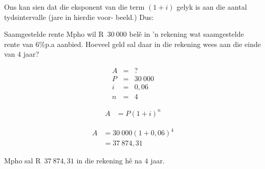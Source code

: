 Ons kan sien dat die eksponent van die term $(1 + i)$ gelyk is aan die aantal tydsintervalle (jare in hierdie voor-
beeld.) Dus:




\begin{wex}{Saamgestelde rente}{
    Mpho wil R~$30~000$ bel\^e in 'n rekening wat saamgestelde rente van $6\%$p.a aanbied. Hoeveel geld sal daar in die rekening wees aan die einde van $4$ jaar?}{
    
    \begin{eqnarray*}
	A &=& ?\\
	P &=& 30~000\\
	i &=& 0,06\\
	n &=& 4
    \end{eqnarray*}

    \begin{align*}
	A &= P(1 + i)^n
    \end{align*}

    \begin{align*}
	A &= 30~000(1 + 0,06)^4\\
	  &= 37~874,31
    \end{align*}

    Mpho sal R~$37~874,31$ in die rekening h\^e na $4$ jaar.
    }
\end{wex}


